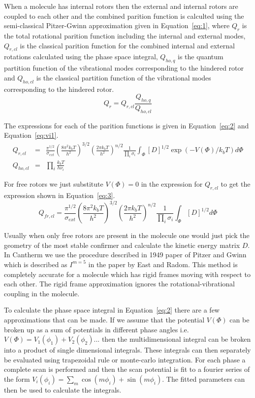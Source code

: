 \documentclass[a4paper,12pt]{article}
\begin{document}
When a molecule has internal rotors then the external and internal rotors are coupled to each other and the combined parition function is calculted using the semi-classical Pitzer-Gwinn approximation given in Equation~\ref{eq:1}, where $Q_{r}$ is the total rotational parition function including the internal and external modes, $Q_{r,cl}$ is the classical parition function for the combined internal and external rotations calculated using the phase space integral, $Q_{ho,q}$ is the quantum partition function of the vibrational modes corresponding to the hindered rotor and $Q_{ho,cl}$ is the classical partition function of the vibrational modes corresponding to the hindered rotor.
\begin{equation}
 Q_{r} = Q_{r,cl}\frac{Q_{ho,q}}{Q_{ho,cl}}
\label{eq:1}
\end{equation}

The expressions for each of the parition functions is given in Equation~\ref{eq:2} and Equation~\ref{eq:vi1}.
\begin{eqnarray}
 Q_{r,cl} &=& \frac{\pi^{1/2}}{\sigma_{ext}}\left(\frac{8\pi^2k_bT}{ h^2}\right)^{3/2} \left( \frac{2 \pi k_b T}{h^2}\right)^{n/2} \frac{1}{\prod_i \sigma_i}\int_{\Phi} [D]^{1/2} \exp{(-V(\Phi)/k_bT)} d\Phi \nonumber \\
Q_{ho,cl} &=& \prod_i \frac{k_bT}{h\nu_i}
\label{eq:2}
\end{eqnarray}

For free rotors we just substitute $V(\Phi)=0$ in the expression for $Q_{r,cl}$ to get the expression shown in Equation~\ref{eq:3}.
\begin{equation}
 Q_{fr,cl} = \frac{\pi^{1/2}}{\sigma_{ext}}\left(\frac{8\pi^2k_bT}{ h^2}\right)^{3/2} \left( \frac{2 \pi k_b T}{h^2}\right)^{n/2} \frac{1}{\prod_i \sigma_i}\int_{\Phi} [D]^{1/2} d\Phi
\label{eq:3}
\end{equation}

Usually when only free rotors are present in the molecule one would just pick the geometry of the most stable confirmer and calculate the kinetic energy matrix $D$. In Cantherm we use the procedure described in 1949 paper of Pitzer and Gwinn which is described as $I^{m=5}$ in the paper by East and Radom. This method is completely accurate for a molecule which has rigid frames moving with respect to each other. The rigid frame approximation ignores the rotational-vibrational coupling in the molecule.

To calculate the phase space integral in Equation~\ref{eq:2} there are a few approximations that can be made. If we assume that the potential $V(\Phi)$ can be broken up as a sum of potentials in different phase angles i.e. $V(\Phi) = V_1(\phi_1)+V_2(\phi_2)...$ then the multidimensional integral can be broken into a product of single dimensional integrals. These integrals can then separately be evaluated using trapezoidal rule or monte-carlo integration. For each phase a complete scan is performed and then the scan potential is fit to a fourier series of the form $V_i(\phi_i)=\sum_m \cos(m\phi_i)+\sin(m\phi_i)$. The fitted parameters can then be used to calculate the integrals.
\end{document}
